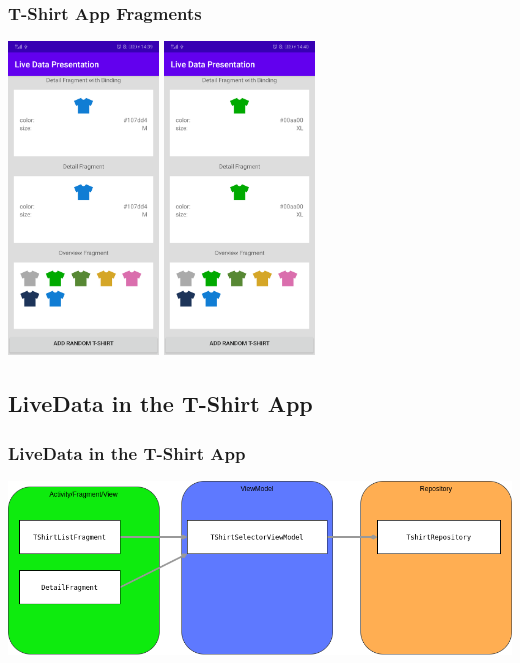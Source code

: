\documentclass{beamer}
\begin{document}
	\begin{frame}
	\frametitle{T-Shirt App Fragments}
	\includegraphics[width=0.3\textwidth]{multiple_shirts_blue.png}
	\hspace*{0.3\textwidth}\includegraphics[width=0.3\textwidth]{multiple_shirts_green.png}
	\end{frame}
	\subsection[Implementation]{LiveData in the T-Shirt App}
	\begin{frame}
		\frametitle{LiveData in the T-Shirt App}
		\includegraphics[width=1\textwidth]{TshirtArchitectureOverview.png}
	\end{frame}
	
\end{document}

